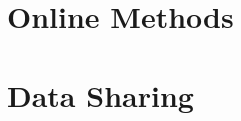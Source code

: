 \documentclass[onecolumn, compsoc,10pt]{IEEEtran}
\def\METHODS{Online Methods\xspace}
\begin{document}







\section*{\METHODS}






\section*{Data Sharing} 
\end{document}
